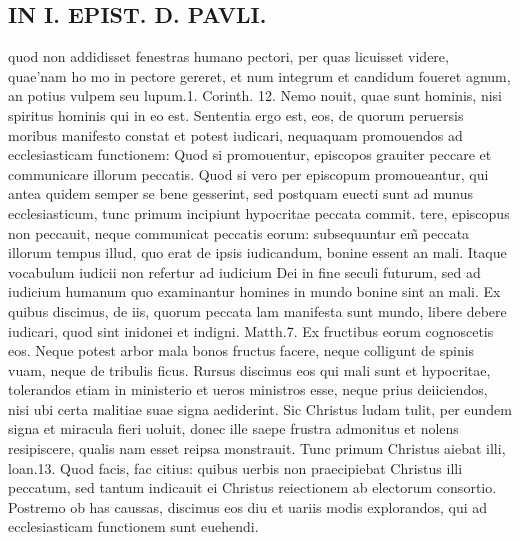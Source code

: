 \documentclass{article}
\begin{document}
\begin{pages}
\section*{IN I. EPIST. D. PAVLI. }
\marginpar{[ p.118 ]}\pstart quod non addidisset fenestras humano pectori, per quas licuisset videre, quae’nam ho mo in pectore gereret, et num integrum et candidum foueret agnum, an potius vulpem seu lupum.1. Corinth. 12. Nemo nouit, quae sunt hominis, nisi spiritus hominis qui in eo est. Sententia ergo est, eos, de quorum peruersis moribus manifesto constat et potest iudicari, nequaquam promouendos ad ecclesiasticam functionem: Quod si promouentur, episcopos grauiter peccare et communicare illorum peccatis. Quod si vero per episcopum promoueantur, qui antea quidem semper se bene gesserint, sed postquam euecti sunt ad munus ecclesiasticum, tunc primum incipiunt hypocritae peccata commit. tere, episcopus non peccauit, neque communicat peccatis eorum: subsequuntur em̃ peccata illorum tempus illud, quo erat de ipsis iudicandum, bonine essent an mali. Itaque vocabulum iudicii non refertur ad iudicium Dei in fine seculi futurum, sed ad iudicium humanum quo examinantur homines in mundo bonine sint an mali. Ex quibus discimus, de iis, quorum peccata lam manifesta sunt mundo, libere debere iudicari, quod sint inidonei et indigni. Matth.7. Ex fructibus eorum cognoscetis eos. Neque potest arbor mala bonos fructus facere, neque colligunt de spinis vuam, neque de tribulis ficus. Rursus discimus eos qui mali sunt et hypocritae, tolerandos etiam in ministerio et ueros ministros esse, neque prius deiiciendos, nisi ubi certa malitiae suae signa aediderint. Sic Christus ludam tulit, per eundem signa et miracula fieri uoluit, donec ille saepe frustra admonitus et nolens resipiscere, qualis nam esset reipsa monstrauit. Tunc primum Christus aiebat illi, loan.13. Quod facis, fac citius: quibus uerbis non praecipiebat Christus illi peccatum, sed tantum indicauit ei Christus reiectionem ab electorum consortio. Postremo ob has caussas, discimus eos diu et uariis modis explorandos, qui ad ecclesiasticam functionem sunt euehendi.  \pend
{}
{}

\end{pages}
\end{document}
